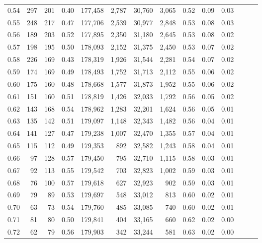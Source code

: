 \begin{tabular}{rrrrrrrrrrrrrr}
0.54 &    297 &    201 &  0.40 &  177,458 &    2,787 &  30,760 &   3,065 &  0.52 &  0.09 &      0.03 \\
0.55 &    248 &    217 &  0.47 &  177,706 &    2,539 &  30,977 &   2,848 &  0.53 &  0.08 &      0.03 \\
0.56 &    189 &    203 &  0.52 &  177,895 &    2,350 &  31,180 &   2,645 &  0.53 &  0.08 &      0.02 \\
0.57 &    198 &    195 &  0.50 &  178,093 &    2,152 &  31,375 &   2,450 &  0.53 &  0.07 &      0.02 \\
0.58 &    226 &    169 &  0.43 &  178,319 &    1,926 &  31,544 &   2,281 &  0.54 &  0.07 &      0.02 \\
0.59 &    174 &    169 &  0.49 &  178,493 &    1,752 &  31,713 &   2,112 &  0.55 &  0.06 &      0.02 \\
0.60 &    175 &    160 &  0.48 &  178,668 &    1,577 &  31,873 &   1,952 &  0.55 &  0.06 &      0.02 \\
0.61 &    151 &    160 &  0.51 &  178,819 &    1,426 &  32,033 &   1,792 &  0.56 &  0.05 &      0.02 \\
0.62 &    143 &    168 &  0.54 &  178,962 &    1,283 &  32,201 &   1,624 &  0.56 &  0.05 &      0.01 \\
0.63 &    135 &    142 &  0.51 &  179,097 &    1,148 &  32,343 &   1,482 &  0.56 &  0.04 &      0.01 \\
0.64 &    141 &    127 &  0.47 &  179,238 &    1,007 &  32,470 &   1,355 &  0.57 &  0.04 &      0.01 \\
0.65 &    115 &    112 &  0.49 &  179,353 &      892 &  32,582 &   1,243 &  0.58 &  0.04 &      0.01 \\
0.66 &     97 &    128 &  0.57 &  179,450 &      795 &  32,710 &   1,115 &  0.58 &  0.03 &      0.01 \\
0.67 &     92 &    113 &  0.55 &  179,542 &      703 &  32,823 &   1,002 &  0.59 &  0.03 &      0.01 \\
0.68 &     76 &    100 &  0.57 &  179,618 &      627 &  32,923 &     902 &  0.59 &  0.03 &      0.01 \\
0.69 &     79 &     89 &  0.53 &  179,697 &      548 &  33,012 &     813 &  0.60 &  0.02 &      0.01 \\
0.70 &     63 &     73 &  0.54 &  179,760 &      485 &  33,085 &     740 &  0.60 &  0.02 &      0.01 \\
0.71 &     81 &     80 &  0.50 &  179,841 &      404 &  33,165 &     660 &  0.62 &  0.02 &      0.00 \\
0.72 &     62 &     79 &  0.56 &  179,903 &      342 &  33,244 &     581 &  0.63 &  0.02 &      0.00 \\

\end{tabular}
